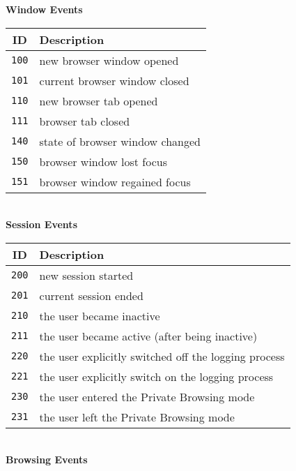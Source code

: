 \documentclass[11pt,fleqn,twoside]{article}
\begin{document}
\begin{table}
\small
\begin{center}
\textbf{Window Events}\\ \vspace{0.1cm}
\begin{tabular}{|c|p{8cm}|}
  \hline
  \textbf{ID} & \textbf{Description} \\
  \hline\hline
  \texttt{100}   &  new browser window opened \\
  \hline
  \texttt{101}   &  current browser window closed \\
  \hline
  \texttt{110}   &  new browser tab opened \\
  \hline
  \texttt{111}   &  browser tab closed\\
  \hline
  \texttt{140}   &  state of browser window changed \\
  \hline
  \texttt{150}   &  browser window lost focus \\
  \hline
  \texttt{151}   &  browser window regained focus \\
  \hline
\end{tabular} 
\\
\vspace{0.4cm}
\textbf{Session Events}\\ \vspace{0.0cm}
\begin{tabular}{|c|p{8cm}|}
  \hline
  \textbf{ID} & \textbf{Description} \\
  \hline\hline
  \texttt{200}   &  new session started \\
  \hline
  \texttt{201}   &  current session ended \\
  \hline
  \texttt{210}   &  the user became inactive \\
  \hline
  \texttt{211}   &  the user became active (after being inactive)\\
  \hline
  \texttt{220}   &  the user explicitly switched off the logging process \\
  \hline
  \texttt{221}   &  the user explicitly switch on the logging process \\
  \hline
  \texttt{230}   &  the user entered the Private Browsing mode \\
  \hline
  \texttt{231}   &  the user left the Private Browsing mode \\
  \hline
\end{tabular} 
\\
\vspace{0.4cm}
\textbf{Browsing Events}\\ \vspace{0.0cm}

\end{center}
\end{table}
\end{document}
